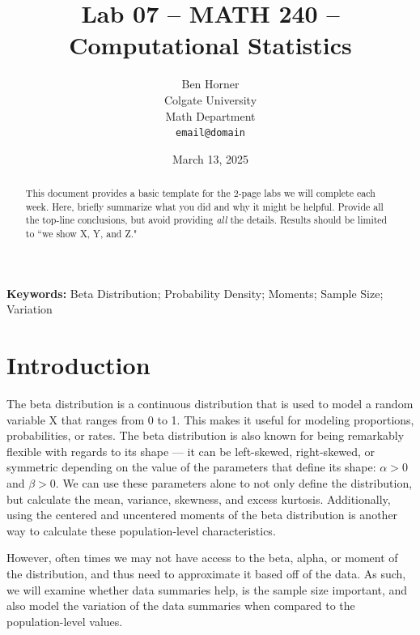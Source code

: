 \documentclass{article}\usepackage[]{graphicx}\usepackage[]{xcolor}
\begin{document}
\vspace{-1in}
\title{Lab 07 -- MATH 240 -- Computational Statistics}

\author{
  Ben Horner \\
  Colgate University  \\
  Math Department  \\
  {\tt email@domain}
}

\date{March 13, 2025}

\maketitle

\begin{multicols}{2}
\begin{abstract}
This document provides a basic template for the 2-page labs we will complete each week. Here, briefly summarize what you did and why it might be helpful. Provide all the top-line conclusions, but avoid providing \emph{all} the details. Results should be limited to ``we show X, Y, and Z."
\end{abstract}

\noindent \textbf{Keywords:} Beta Distribution; Probability Density; Moments; Sample Size; Variation

\section{Introduction}
The beta distribution is a continuous distribution that is used to model a random variable X that ranges from 0 to 1. This makes it useful for modeling proportions, probabilities, or rates. The beta distribution is also known for being remarkably flexible with regards to its shape --- it can be left-skewed, right-skewed, or symmetric depending on the value of the parameters that define its shape: $\alpha > 0$ and $\beta > 0$. We can use these parameters alone to not only define the distribution, but calculate the mean, variance, skewness, and excess kurtosis. Additionally, using the centered and uncentered moments of the beta distribution is another way to calculate these population-level characteristics.

However, often times we may not have access to the beta, alpha, or moment of the distribution, and thus need to approximate it based off of the data. As such, we will examine whether data summaries help, is the sample size important, and also model the variation of the data summaries when compared to the population-level values. 



\end{multicols}
\end{document}
